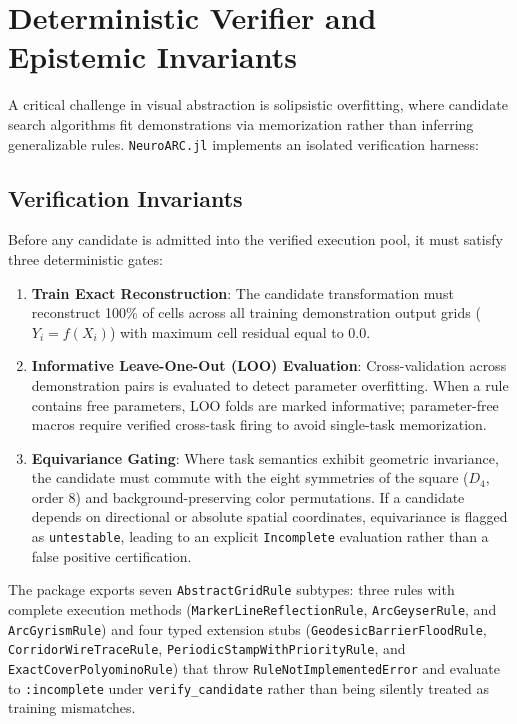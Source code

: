 \section{Deterministic Verifier and Epistemic Invariants}

A critical challenge in visual abstraction is solipsistic overfitting, where candidate search algorithms fit demonstrations via memorization rather than inferring generalizable rules. \texttt{NeuroARC.jl} implements an isolated verification harness:

\subsection{Verification Invariants}
Before any candidate is admitted into the verified execution pool, it must satisfy three deterministic gates:
\begin{enumerate}
  \item \textbf{Train Exact Reconstruction}: The candidate transformation must reconstruct 100\% of cells across all training demonstration output grids ($Y_i = f(X_i)$) with maximum cell residual equal to 0.0.
  \item \textbf{Informative Leave-One-Out (LOO) Evaluation}: Cross-validation across demonstration pairs is evaluated to detect parameter overfitting. When a rule contains free parameters, LOO folds are marked informative; parameter-free macros require verified cross-task firing to avoid single-task memorization.
  \item \textbf{Equivariance Gating}: Where task semantics exhibit geometric invariance, the candidate must commute with the eight symmetries of the square ($D_4$, order 8) and background-preserving color permutations. If a candidate depends on directional or absolute spatial coordinates, equivariance is flagged as \texttt{untestable}, leading to an explicit \texttt{Incomplete} evaluation rather than a false positive certification.
\end{enumerate}
\sloppy
The package exports seven \texttt{AbstractGridRule} subtypes: three rules with complete execution methods (\texttt{MarkerLineReflectionRule}, \texttt{ArcGeyserRule}, and \texttt{ArcGyrismRule}) and four typed extension stubs (\texttt{GeodesicBarrierFloodRule}, \texttt{CorridorWireTraceRule}, \texttt{PeriodicStampWithPriorityRule}, and \texttt{ExactCoverPolyominoRule}) that throw \texttt{RuleNotImplementedError} and evaluate to \texttt{:incomplete} under \texttt{verify\_candidate} rather than being silently treated as training mismatches.
\fussy

